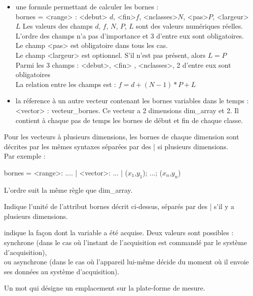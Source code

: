 \begin{description}
\begin{itemize}
\item une formule permettant de calculer les bornes : \\
bornes = <range> : <debut> $d$, <fin>$f$, <nclasses>$N$, <pas>$P$, <largeur>$L$
Les valeurs des champs $d$, $f$, $N$, $P$, $L$ sont des valeurs numériques réelles.\\
L'ordre des champs n'a pas d'importance et 3 d'entre eux sont obligatoires.\\
Le champ <pas> est obligatoire dans tous les cas.\\
Le champ <largeur> est optionnel.  S'il n’est pas présent, alors $L = P$ \\
Parmi les 3 champs : <debut>, <fin> , <nclasses>, 2 d’entre eux sont obligatoires \\
La relation entre les champs est :  $f = d + (N -1)*P + L$ 

\item la réference à un  autre vecteur contenant les bornes variables dans le temps : \\
<vector> : \textsf{vecteur\_bornes}. Ce vecteur a 2 dimensions \textsf{dim\_array} et 2. Il contient à chaque pas de temps les bornes de début et fin de chaque classe.\\ 

\end{itemize}

Pour les vecteurs à plusieurs dimensions, les bornes de chaque dimension sont décrites par 
les mêmes syntaxes séparées par des \textsf{|} si plusieurs dimensions. \\
Par exemple : 

\-\hspace{1cm} {bornes = <range>: .... | <vector>: ...  | ($x_1$,$y_1$); ...; ($x_n$,$y_n$)}

L'ordre suit la même règle que \textsf{dim\_array}.

   \item[unit\_bornes] Indique l'unité de l'attribut \textsf{bornes}
décrit ci-dessus, séparés par des \textsf{|} s'il y a plusieurs dimensions.
   \item[type\_acq]indique la façon dont la variable a
    été acquise. Deux valeurs sont possibles :\\
    \textsf{synchrone} (dans le cas où l'instant de l'acquisition est
     commandé par le système d'acquisition),\\
     ou \textsf{asynchrone}
      (dans le cas où l'appareil lui-même décide du moment où
      il envoie ses données au système d'acquisition).
   \item[position] Un mot qui désigne un emplacement sur la plate-forme
    de mesure.


\end{description}
